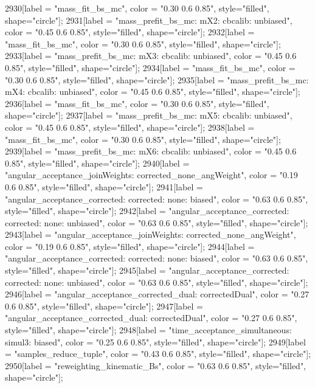 {	2930[label = "mass_fit_bs_mc", color = "0.30 0.6 0.85", style="filled", shape="circle"];
	2931[label = "mass_prefit_bs_mc\nmassbin: mX2\nmassmodel: cbcalib\ntrigger: unbiased", color = "0.45 0.6 0.85", style="filled", shape="circle"];
	2932[label = "mass_fit_bs_mc", color = "0.30 0.6 0.85", style="filled", shape="circle"];
	2933[label = "mass_prefit_bs_mc\nmassbin: mX3\nmassmodel: cbcalib\ntrigger: unbiased", color = "0.45 0.6 0.85", style="filled", shape="circle"];
	2934[label = "mass_fit_bs_mc", color = "0.30 0.6 0.85", style="filled", shape="circle"];
	2935[label = "mass_prefit_bs_mc\nmassbin: mX4\nmassmodel: cbcalib\ntrigger: unbiased", color = "0.45 0.6 0.85", style="filled", shape="circle"];
	2936[label = "mass_fit_bs_mc", color = "0.30 0.6 0.85", style="filled", shape="circle"];
	2937[label = "mass_prefit_bs_mc\nmassbin: mX5\nmassmodel: cbcalib\ntrigger: unbiased", color = "0.45 0.6 0.85", style="filled", shape="circle"];
	2938[label = "mass_fit_bs_mc", color = "0.30 0.6 0.85", style="filled", shape="circle"];
	2939[label = "mass_prefit_bs_mc\nmassbin: mX6\nmassmodel: cbcalib\ntrigger: unbiased", color = "0.45 0.6 0.85", style="filled", shape="circle"];
	2940[label = "angular_acceptance_joinWeights\nwflag: corrected_none_angWeight", color = "0.19 0.6 0.85", style="filled", shape="circle"];
	2941[label = "angular_acceptance_corrected\nangacc: corrected\ncsp: none\ntrigger: biased", color = "0.63 0.6 0.85", style="filled", shape="circle"];
	2942[label = "angular_acceptance_corrected\nangacc: corrected\ncsp: none\ntrigger: unbiased", color = "0.63 0.6 0.85", style="filled", shape="circle"];
	2943[label = "angular_acceptance_joinWeights\nwflag: corrected_none_angWeight", color = "0.19 0.6 0.85", style="filled", shape="circle"];
	2944[label = "angular_acceptance_corrected\nangacc: corrected\ncsp: none\ntrigger: biased", color = "0.63 0.6 0.85", style="filled", shape="circle"];
	2945[label = "angular_acceptance_corrected\nangacc: corrected\ncsp: none\ntrigger: unbiased", color = "0.63 0.6 0.85", style="filled", shape="circle"];
	2946[label = "angular_acceptance_corrected_dual\nstep: correctedDual", color = "0.27 0.6 0.85", style="filled", shape="circle"];
	2947[label = "angular_acceptance_corrected_dual\nstep: correctedDual", color = "0.27 0.6 0.85", style="filled", shape="circle"];
	2948[label = "time_acceptance_simultaneous\ntimeacc: simul3\ntrigger: biased", color = "0.25 0.6 0.85", style="filled", shape="circle"];
	2949[label = "samples_reduce_tuple", color = "0.43 0.6 0.85", style="filled", shape="circle"];
	2950[label = "reweighting_kinematic_Bs", color = "0.63 0.6 0.85", style="filled", shape="circle"];
}

